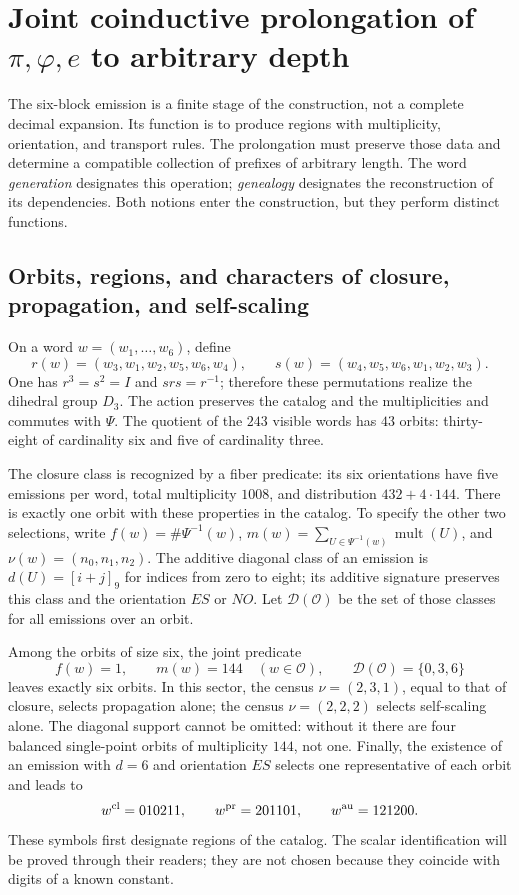 \section{Joint coinductive prolongation of \texorpdfstring{\(\pi,\varphi,e\)}{pi, phi, e} to arbitrary depth}
\label{sec:generacion}

The six-block emission is a finite stage of the construction, not a complete decimal expansion. Its function is to produce regions with multiplicity, orientation, and transport rules. The prolongation must preserve those data and determine a compatible collection of prefixes of arbitrary length. The word \emph{generation} designates this operation; \emph{genealogy} designates the reconstruction of its dependencies. Both notions enter the construction, but they perform distinct functions.

\subsection{Orbits, regions, and characters of closure, propagation, and self-scaling}

On a word \(w=(w_1,\ldots,w_6)\), define
\[
 r(w)=(w_3,w_1,w_2,w_5,w_6,w_4),\qquad
 s(w)=(w_4,w_5,w_6,w_1,w_2,w_3).
\]
One has \(r^3=s^2=I\) and \(srs=r^{-1}\); therefore these permutations realize the dihedral group \(D_3\). The action preserves the catalog and the multiplicities and commutes with \(\Psi\). The quotient of the \(243\) visible words has \(43\) orbits: thirty-eight of cardinality six and five of cardinality three.

The closure class is recognized by a fiber predicate: its six orientations have five emissions per word, total multiplicity \(1008\), and distribution \(432+4\cdot144\). There is exactly one orbit with these properties in the catalog. To specify the other two selections, write \(f(w)=\#\Psi^{-1}(w)\), \(m(w)=\sum_{U\in\Psi^{-1}(w)}\operatorname{mult}(U)\), and \(\nu(w)=(n_0,n_1,n_2)\). The additive diagonal class of an emission is \(d(U)=[i+j]_9\) for indices from zero to eight; its additive signature preserves this class and the orientation \(ES\) or \(NO\). Let \(\mathcal D(\mathcal O)\) be the set of those classes for all emissions over an orbit.

Among the orbits of size six, the joint predicate
\[
 f(w)=1,\qquad m(w)=144\quad(w\in\mathcal O),\qquad
 \mathcal D(\mathcal O)=\{0,3,6\}
\]
leaves exactly six orbits. In this sector, the census \(\nu=(2,3,1)\), equal to that of closure, selects propagation alone; the census \(\nu=(2,2,2)\) selects self-scaling alone. The diagonal support cannot be omitted: without it there are four balanced single-point orbits of multiplicity \(144\), not one. Finally, the existence of an emission with \(d=6\) and orientation \(ES\) selects one representative of each orbit and leads to
\begin{equation}
 w^{\rm cl}=010211,\qquad w^{\rm pr}=201101,\qquad w^{\rm au}=121200.
 \label{eq:palabras-regionales}
\end{equation}
These symbols first designate regions of the catalog. The scalar identification will be proved through their readers; they are not chosen because they coincide with digits of a known constant.

